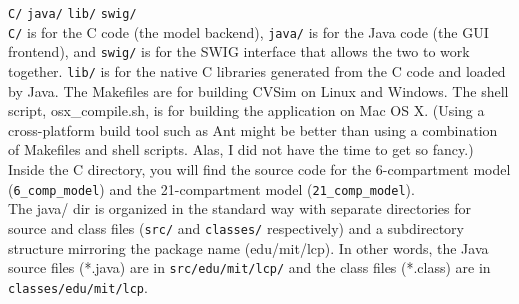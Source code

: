 \documentclass[12pt]{article}
\begin{document}
\noindent \texttt{C/}    \hspace{1cm}     
          \texttt{java/} \hspace{1cm}
          \texttt{lib/}  \hspace{1cm}
	  \texttt{swig/} \hspace{1cm} \\

\noindent \texttt{C/} is for the C code (the model backend),
\texttt{java/} is for the Java code (the GUI frontend), and
\texttt{swig/} is for the SWIG interface that allows the two to work
together. \texttt{lib/} is for the native C libraries generated from
the C code and loaded by Java. The Makefiles are for building CVSim on
Linux and Windows. The shell script, osx\_compile.sh, is for building
the application on Mac OS X. (Using a cross-platform build tool such
as Ant might be better than using a combination of Makefiles and shell
scripts. Alas, I did not have the time to get so fancy.) \\

\noindent Inside the C directory, you will find the source code for the
6-compartment model (\texttt{6\_comp\_model}) and the 21-compartment model
(\texttt{21\_comp\_model}). \\

\noindent The java/ dir is organized in the standard way with separate
directories for source and class files (\texttt{src/} and
\texttt{classes/} respectively) and a subdirectory structure mirroring
the package name (edu/mit/lcp). In other words, the Java source files
(*.java) are in \texttt{src/edu/mit/lcp/} and the class files
(*.class) are in \texttt{classes/edu/mit/lcp}. \\
\end{document}
